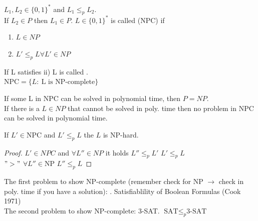 \begin{lemma}
  $L_{1}, L_{2} \in \{ 0,1 \}^*$ and $L_{1} \leq_{p} L_{2}$.\\
  If $L_{2} \in P$ then $L_{1} \in P$.
  \vspace{0.3cm}
  $L \in \{ 0,1 \}^*$ is called  (NPC) if
  \begin{enumerate}
    \item $L \in NP$
    \item $L' \leq_{p} L \forall L' \in NP$
  \end{enumerate}
  If L satisfies ii) L is called .\\
  $\text{NPC} = \{ L: ~ \text{L is NP-complete} \}$
\end{lemma}

\begin{lemma}
  If some L in NPC can be solved in polynomial time, then $P=NP$.\\
  If there is a $L \in NP$ that cannot be solved in poly. time then no problem in NPC can be solved in polynomial time.
\end{lemma}

\begin{lemma}
  If $L' \in \text{NPC}$ and $L' \leq_{p} L$ the $L$ is NP-hard.
\end{lemma}

\begin{proof}{}
 $L' \in NPC$ and $\forall L'' \in NP$ it holds $L'' \leq_{p} L'$ $L' \leq_{p} L$ \\
 $">"$ $\forall L'' \in \text{NP}$ $L'' \leq_{p} L$
\end{proof}

\vspace{0.3cm}
The first problem to show NP-complete (remember check for NP $\rightarrow$ check in poly. time if you have a solution): . Satisfiablility of Boolean Formulas (Cook 1971)\\
The second problem to show NP-complete: 3-SAT. $\text{SAT} \leq_{p} \text{3-SAT}$